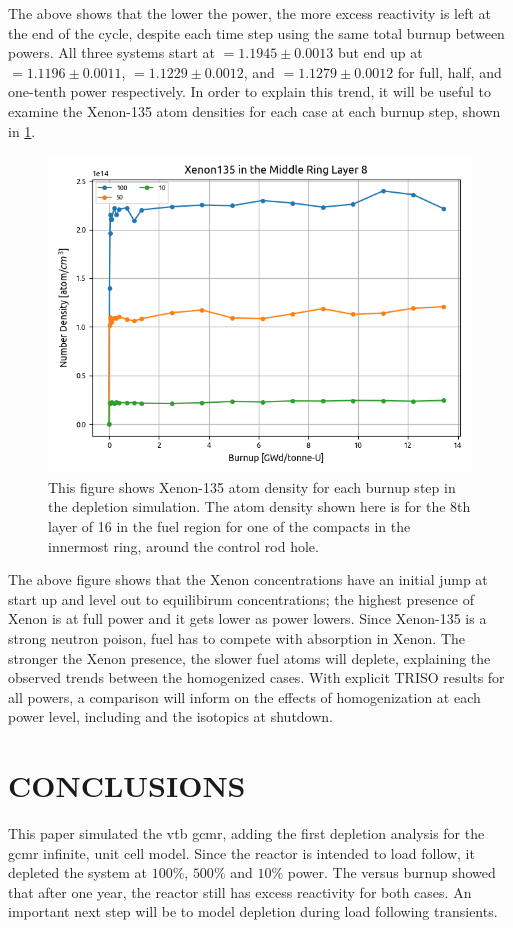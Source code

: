 \documentclass[letterpaper]{physor2024}
\begin{document}
The above shows that the lower the power, the more excess reactivity is left at the end of the cycle, despite each time step using the same total burnup between powers. All three systems start at \kinf$=1.1945 \pm 0.0013 $ but end up at \kinf$=1.1196 \pm 0.0011 $, \kinf$=1.1229 \pm 0.0012$, and \kinf$=1.1279 \pm 0.0012$ for full, half, and one-tenth power respectively. In order to explain this trend, it will be useful to examine the Xenon-135 atom densities for each case at each burnup step, shown in \cref{fig:homog_xenons}.
\begin{figure}[!h]
    \centering
    \includegraphics[width=0.6\linewidth]{figures/mid_compact_layer_8_Xe135.png}
    \caption{This figure shows Xenon-135 atom density for each burnup step in the depletion simulation. The atom density shown here is for the 8th layer of 16 in the fuel region for one of the compacts in the innermost ring, around the control rod hole. }
    \label{fig:homog_xenons}
\end{figure}

The above figure shows that the Xenon concentrations have an initial jump at start up and level out to equilibirum concentrations; the highest presence of Xenon is at full power and it gets lower as power lowers. Since Xenon-135 is a strong neutron poison, fuel has to compete with absorption in Xenon. The stronger the Xenon presence, the slower fuel atoms will deplete, explaining the observed trends between the homogenized cases. With explicit TRISO results for all powers, a comparison will inform on the effects of homogenization at each power level, including \keff and the isotopics at shutdown.

\section{CONCLUSIONS}\label{sec:conclusions}
This paper simulated the \gls{vtb} \gls{gcmr}, adding the first depletion analysis for the \gls{gcmr} infinite, unit cell model. Since the reactor is intended to load follow, it depleted the system at $100\%$, $500\%$ and $10\%$ power. The \kinf versus burnup showed that after one year, the reactor still has excess reactivity for both cases. An important next step will be to model depletion during load following transients.
\end{document}

